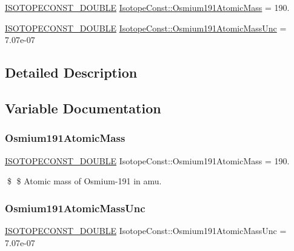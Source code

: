 \begin{DoxyCompactItemize}
\item 
\mbox{\hyperlink{group___isotope_const-_macros_ga8f45a7272ce02c0b4c65c44636ed719a}{I\+S\+O\+T\+O\+P\+E\+C\+O\+N\+S\+T\+\_\+\+D\+O\+U\+B\+LE}} \mbox{\hyperlink{group___isotope_const-_osmium-_os191_gacd72d7552b6548709136b12622508367}{Isotope\+Const\+::\+Osmium191\+Atomic\+Mass}} = 190.
\item 
\mbox{\hyperlink{group___isotope_const-_macros_ga8f45a7272ce02c0b4c65c44636ed719a}{I\+S\+O\+T\+O\+P\+E\+C\+O\+N\+S\+T\+\_\+\+D\+O\+U\+B\+LE}} \mbox{\hyperlink{group___isotope_const-_osmium-_os191_gaa0ac7191e232819655dcf21e0be524f5}{Isotope\+Const\+::\+Osmium191\+Atomic\+Mass\+Unc}} = 7.\+07e-\/07
\end{DoxyCompactItemize}


\subsection{Detailed Description}


\subsection{Variable Documentation}
\mbox{\label{group___isotope_const-_osmium-_os191_gacd72d7552b6548709136b12622508367}} 
\subsubsection{\texorpdfstring{Osmium191\+Atomic\+Mass}{Osmium191AtomicMass}}
{\footnotesize\ttfamily \mbox{\hyperlink{group___isotope_const-_macros_ga8f45a7272ce02c0b4c65c44636ed719a}{I\+S\+O\+T\+O\+P\+E\+C\+O\+N\+S\+T\+\_\+\+D\+O\+U\+B\+LE}} Isotope\+Const\+::\+Osmium191\+Atomic\+Mass = 190.}

\$ \$ Atomic mass of Osmium-\/191 in amu. \mbox{\label{group___isotope_const-_osmium-_os191_gaa0ac7191e232819655dcf21e0be524f5}} 
\subsubsection{\texorpdfstring{Osmium191\+Atomic\+Mass\+Unc}{Osmium191AtomicMassUnc}}
{\footnotesize\ttfamily \mbox{\hyperlink{group___isotope_const-_macros_ga8f45a7272ce02c0b4c65c44636ed719a}{I\+S\+O\+T\+O\+P\+E\+C\+O\+N\+S\+T\+\_\+\+D\+O\+U\+B\+LE}} Isotope\+Const\+::\+Osmium191\+Atomic\+Mass\+Unc = 7.\+07e-\/07}

